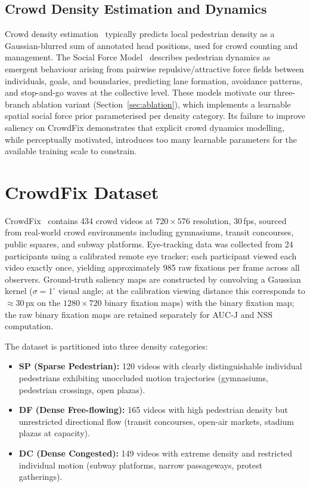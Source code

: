 \documentclass[twocolumn]{article}
\begin{document}
\subsection{Crowd Density Estimation and \mbox{Dynamics}}

Crowd density estimation~\citep{zhang2016} typically predicts local
pedestrian density as a Gaussian-blurred sum of annotated head positions,
used for crowd counting and management.  The Social Force
Model~\citep{helbing} describes pedestrian dynamics as emergent behaviour
arising from pairwise repulsive/attractive force fields between individuals,
goals, and boundaries, predicting lane formation, avoidance patterns, and
stop-and-go waves at the collective level.  These models motivate our
three-branch ablation variant (Section~\ref{sec:ablation}), which implements
a learnable spatial social force prior parameterised per density category.
Its failure to improve saliency on CrowdFix demonstrates that explicit crowd
dynamics modelling, while perceptually motivated, introduces too many
learnable parameters for the available training scale to constrain.

\section{CrowdFix Dataset}
\label{sec:dataset}

CrowdFix~\citep{crowdfix} contains 434 crowd videos at $720\!\times\!576$
resolution, 30\,fps, sourced from real-world crowd environments including
gymnasiums, transit concourses, public squares, and subway platforms.
Eye-tracking data was collected from 24 participants using a calibrated
remote eye tracker; each participant viewed each video exactly once, yielding
approximately 985 raw fixations per frame across all observers.  Ground-truth
saliency maps are constructed by convolving a Gaussian kernel
($\sigma\!=\!1^\circ$ visual angle; at the calibration viewing distance
this corresponds to $\approx\!30$\,px on the $1280\!\times\!720$ binary
fixation maps) with the binary fixation map; the raw binary fixation maps
are retained separately for AUC-J and NSS computation.

The dataset is partitioned into three density categories:
\begin{itemize}
  \item \textbf{SP (Sparse Pedestrian):}  120 videos with clearly
        distinguishable individual pedestrians exhibiting unoccluded motion
        trajectories (gymnasiums, pedestrian crossings, open plazas).
  \item \textbf{DF (Dense Free-flowing):}  165 videos with high pedestrian
        density but unrestricted directional flow (transit concourses,
        open-air markets, stadium plazas at capacity).
  \item \textbf{DC (Dense Congested):}  149 videos with extreme density
        and restricted individual motion (subway platforms, narrow passageways,
        protest gatherings).
\end{itemize}
\end{document}
